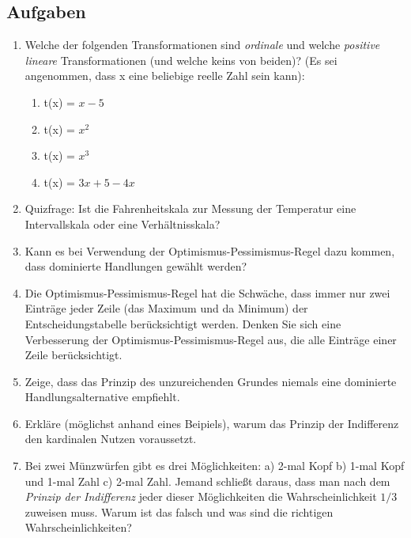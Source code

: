 \subsection{Aufgaben}
\begin{enumerate}

\item Welche der folgenden Transformationen sind {\em ordinale} und welche {\em
positive lineare} Transformationen (und welche keins von beiden)? (Es sei
angenommen, dass x eine beliebige reelle Zahl sein kann):
   \begin{enumerate}
     \item t(x) = $x - 5$
     \item t(x) = $x^2$
     \item t(x) = $x^3$
     \item t(x) = $3x + 5 - 4x$
   \end{enumerate}
   
\item Quizfrage: Ist die Fahrenheitskala zur Messung der Temperatur eine
Intervallskala oder eine Verhältnisskala?
   
\item Kann es bei Verwendung der Optimismus-Pessimismus-Regel dazu kommen, dass
dominierte Handlungen gewählt werden?

\item Die Optimismus-Pessimismus-Regel hat die Schwäche, dass immer nur zwei
Einträge jeder Zeile (das Maximum und da Minimum) der Entscheidungstabelle
berücksichtigt werden. Denken Sie sich eine Verbesserung der
Optimismus-Pessimismus-Regel aus, die alle Einträge einer Zeile berücksichtigt.

\item Zeige, dass das Prinzip des unzureichenden Grundes niemals eine dominierte
Handlungsalternative empfiehlt.
 
\item Erkläre (möglichst anhand eines Beipiels), warum das Prinzip der
Indifferenz den kardinalen Nutzen voraussetzt.

\item Bei zwei Münzwürfen gibt es drei Möglichkeiten: a) 2-mal Kopf b) 1-mal
Kopf und 1-mal Zahl c) 2-mal Zahl. Jemand schließt daraus, dass man nach dem
{\em Prinzip der Indifferenz} jeder dieser Möglichkeiten die Wahrscheinlichkeit
$1/3$ zuweisen muss. Warum ist das falsch und was sind die richtigen
Wahrscheinlichkeiten?


\end{enumerate}
